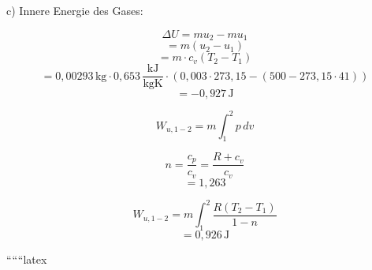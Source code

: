 c) Innere Energie des Gases:

\[
\Delta U = m u_2 - m u_1
\]
\[
= m \left( u_2 - u_1 \right)
\]
\[
= m \cdot c_v \left( T_2 - T_1 \right)
\]
\[
= 0{,}00293 \, \text{kg} \cdot 0{,}653 \, \frac{\text{kJ}}{\text{kgK}} \cdot \left( 0{,}003 \cdot 273{,}15 - (500 - 273{,}15 \cdot 41) \right)
\]
\[
= -0{,}927 \, \text{J}
\]

\[
W_{u,1-2} = m \int_{1}^{2} p \, dv
\]

\[
n = \frac{c_p}{c_v} = \frac{R + c_v}{c_v}
\]
\[
= 1{,}263
\]

\[
W_{u,1-2} = m \int_{1}^{2} \frac{R \left( T_2 - T_1 \right)}{1 - n}
\]
\[
= 0{,}926 \, \text{J}
\]

``````latex